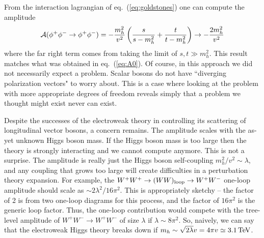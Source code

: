 \documentclass[12pt]{article}
\def\beq{\begin{eqnarray}}
\def\eeq{\end{eqnarray}}
\def\tev{\, {\rm TeV}}
\begin{document}
From the interaction lagrangian of eq.~(\ref{eq:goldstones}) one can compute the amplitude
\beq
{\cal A}(\phi^+\phi^-\to \phi^+\phi^-)=-\frac{m^2_h}{v^2}\left( \frac{s}{s-m_h^2}+\frac{t}{t-m^2_h}\right)
\to -\frac{2m_h^2}{v^2}
\eeq
where the far right term comes from taking the limit of $s,t\gg m_h^2$. This result matches what was obtained in eq.~(\ref{eq:A0}). Of course, in this approach we did not necessarily expect a problem.
Scalar bosons do not have ``diverging polarization vectors" to worry about. This is a case where looking at the problem with more appropriate degrees of freedom reveals simply that a problem we thought might exist never can exist.


Despite the successes of the electroweak theory in controlling its scattering of longitudinal vector bosons, a concern remains. The amplitude scales with the as-yet unknown Higgs boson mass. If the Higgs boson mass is too large then the theory is strongly interacting and we cannot compute anymore. This is not a surprise. The amplitude is really just the Higgs boson self-coupling $m^2_h/v^2\sim \lambda$, and any coupling that grows too large will create difficulties in a perturbation theory expansion.  For example, the $W^+W^+\to (WW)_{\rm loop}\to W^+W^-$ one-loop amplitude should scale as $\sim 2\lambda^2/16\pi^2$. This is appropriately sketchy -- the factor of 2 is from two one-loop diagrams for this process, and the factor of $16\pi^2$ is the generic loop factor. Thus, the one-loop contribution would compete with the tree-level amplitude of $W^+W^-\to W^+W^-$ of size $\lambda$ if $\lambda\sim 8\pi^2$. So, naively, we can say that the electroweak Higgs theory breaks down if $m_h\sim \sqrt{2\lambda}v=4\pi v\simeq 3.1\tev$.
\end{document}
